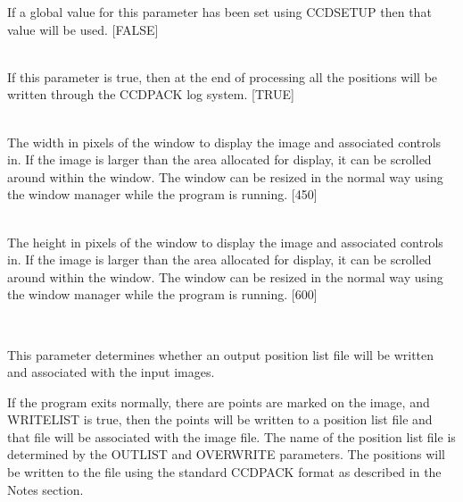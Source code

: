 \documentclass[twoside,11pt]{article}
\newcommand{\htmlref}[2]{#1}
\renewcommand{\_}{\texttt{\symbol{95}}}
\newcommand{\xroutine}[1]{\htmlref{{\sc #1}}{#1}}
\newcommand{\sstsubsection}[1]{ \item[{#1}] \mbox{} \\}
\newcommand{\sstsubsection}[1]{\item[{#1}]}
\begin{document}
{{{         If a global value for this parameter has been set using
         \xroutine{CCDSETUP} then that value will be used.
         [FALSE]
      }
      \sstsubsection{
         VERBOSE = \_LOGICAL (Read)
      }{
         If this parameter is true, then at the end of processing all
         the positions will be written through the CCDPACK log system.
         [TRUE]
      }
      \sstsubsection{
         WINX = \_INTEGER (Read and Write)
      }{
         The width in pixels of the window to display the image and
         associated controls in.  If the image is larger than the area
         allocated for display, it can be scrolled around within the
         window.  The window can be resized in the normal way using
         the window manager while the program is running.
         [450]
      }
      \sstsubsection{
         WINY = \_INTEGER (Read and Write)
      }{
         The height in pixels of the window to display the image and
         associated controls in.  If the image is larger than the area
         allocated for display, it can be scrolled around within the
         window.  The window can be resized in the normal way using
         the window manager while the program is running.
         [600]
      }
      \sstsubsection{
         WRITELIST = \_LOGICAL (Read)
      }{
         This parameter determines whether an output position list
         file will be written and associated with the input images.

         If the program exits normally, there are points are marked
         on the image, and WRITELIST is true, then the points will be
         written to a position list file and that file will be associated
         with the image file.  The name of the position list file is
         determined by the OUTLIST and OVERWRITE parameters.  The
         positions will be written to the file using the standard
         CCDPACK format as described in the Notes section.

}}}
\end{document}
